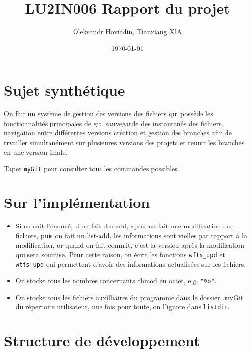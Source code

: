 \documentclass{report}
\title{LU2IN006 Rapport du projet}
\author{Oleksandr Hoviadin, Tianxiang XIA}
\date{\today}
\begin{document}
\maketitle
\section{Sujet synthétique}
On fait un système de gestion des versions des fichiers
qui possède les fonctionnalités principales de git. sauvegarde des instantanés
des fichiers, navigation entre différentes versions
création et gestion des branches afin de trvailler simultanément
sur plusieures versions des projets et reunir les branches
en une version finale.

Taper \verb|myGit| pour consulter tous les commandes possibles.
\section{Sur l'implémentation}
\begin{itemize}
  \item Si on suit l'énoncé, si on fait des add, après on fait une modification des fichiers,
  puis on fait un list-add, les informations sont vielles par rapport à la modification, or quand on
  fait commit, c'est la version après la modification qui sera soumise. Pour cette raison, on écrit les
  fonctions \verb|wfts_upd| et \verb|wtts_upd| qui permettent d'avoir des informations actualisées sur
  les fichiers.
  \item On stocke tous les nombres concernants chmod en octet, e.g. \verb|"%o"|.
  \item On stocke tous les fichiers auxilliaires du programme dans le dossier .myGit
  du répertoire utilisateur, une fois pour toute, on l'ignore dans \verb|listdir|.
\end{itemize}

\section{Structure de développement}
\end{document}
